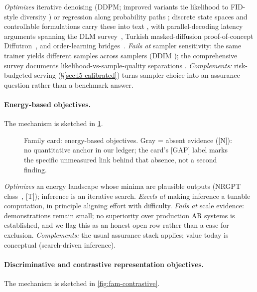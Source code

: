 \documentclass[11pt]{article}
\begin{document}
\textit{Optimizes} iterative denoising (DDPM; improved variants tie likelihood to
FID-style diversity \cite{ho2020ddpm,nichol2021improved}) or regression along probability paths
\cite{lipman2023flow}; discrete state spaces and controllable formulations carry these into
text \cite{austin2021d3pm,li2022diffusionlm}, with parallel-decoding latency arguments spanning
the DLM survey~\cite{zhan2025dlmsurvey}, Turkish masked-diffusion proof-of-concept
 Diffutron~\cite{id260320466}, and order-learning bridges~\cite{mdm2025orderar}.
\textit{Fails at} sampler sensitivity: the same trainer yields different samples across samplers
(DDIM \cite{song2021ddim}); the comprehensive survey documents likelihood-vs-sample-quality separations
\cite{acm2023diffusionsurvey}. \textit{Complements:} risk-budgeted serving (\S\ref{sec:l5-calibrated}) turns
sampler choice into an assurance question rather than a benchmark answer.

\paragraph{Energy-based objectives.}
\noindent The mechanism is sketched in \cref{fig:fam-energy}.

\begin{figure}[t]\centering
  \resizebox{\linewidth}{!}{}
  \caption{Family card: energy-based objectives. Gray = absent evidence ([N]): no quantitative anchor in our ledger; the card's [GAP] label marks the specific unmeasured link behind that absence, not a second finding.}
  \label{fig:fam-energy}
\end{figure}

\textit{Optimizes} an energy landscape whose minima are plausible outputs (NRGPT
class~\cite{nrgpt2025}, [T]);
inference is an iterative search. \textit{Excels at} making inference a tunable
computation, in principle aligning effort with difficulty. \textit{Fails at} scale evidence:
demonstrations remain small; no superiority over production AR systems is established, and we
flag this as an honest open row rather than a case for exclusion. \textit{Complements:} the usual
assurance stack applies; value today is conceptual (search-driven inference).

\paragraph{Discriminative and contrastive representation objectives.}
\noindent The mechanism is sketched in \cref{fig:fam-contrastive}.
\end{document}
